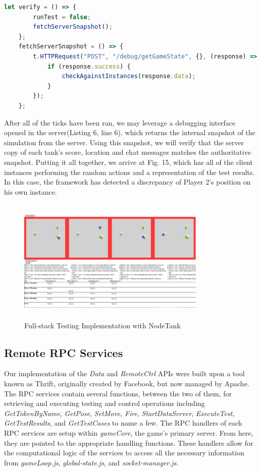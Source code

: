 \documentclass[conference]{IEEEtran}
\begin{document}
\begin{lstlisting}[language=JavaScript,caption={Snippet of Verification Code}]
    let verify = () => {
        runTest = false;
        fetchServerSnapshot();
    };
	fetchServerSnapshot = () => {
        t.HTTPRequest("POST", "/debug/getGameState", {}, (response) => {
            if (response.success) {
                checkAgainstInstances(response.data);
            }
        });
    };
\end{lstlisting}

After all of the ticks have been ran, we may leverage a debugging interface opened in the server(Listing 6, line 6), which returns the internal snapshot of the simulation from the server. 
Using this snapshot, we will verify that the server copy of each tank's score, location and chat messages matches the authoritative snapshot. Putting it all together, we arrive at Fig. 15, which 
has all of the client instances performing the random actions and a representation of the test results. In this case, the framework has detected a discrepancy of Player 2's position on his own
instance. 

\begin{figure}[htbp]
\centerline{\includegraphics [width = 9cm, height = 6cm] {images/FullFullStackTesting.jpg}}
\caption{Full-stack Testing Implementation with NodeTank}
\end{figure}


\subsection{Remote RPC Services}
Our implementation of the \textit{Data} and \textit{RemoteCtrl} APIs were built upon a tool known as Thrift, originally created by Facebook, but now managed by Apache. The RPC services contain several functions, between the two of them, for retrieving and executing testing and control operations including \textit{GetTokenByName}, \textit{GetPose}, \textit{SetMove}, \textit{Fire}, \textit{StartDataServer}, \textit{ExecuteTest}, \textit{GetTestResults}, and \textit{GetTestCases} to name a few. The RPC handlers of each RPC services are setup within \textit{gameCore}, the game's primary server. From here, they are pointed to the appropriate handling functions. These handlers allow for the computational logic of the services to access all the necessary information from \textit{gameLoop.js}, \textit{global-state.js}, and \textit{socket-manager.js}.
\end{document}
